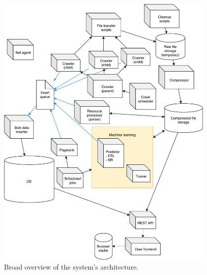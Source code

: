 \begin{figure}
    \centering
    \includegraphics[width=0.95\textwidth]{media/system}
    \caption{Broad overview of the system's architecture.}
\end{figure}